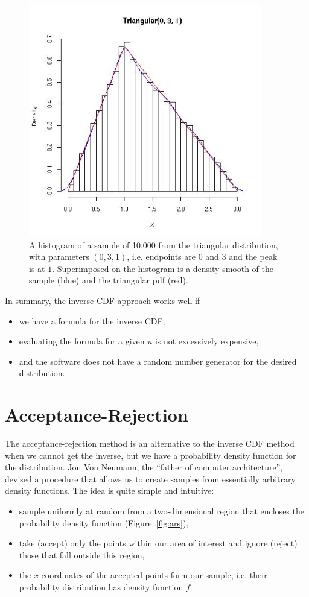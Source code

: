 \begin{figure}[htbp]
  \begin{center}
    \leavevmode
    \includegraphics[width=4in]{RNG/images/TriaInvCDF.jpg}
    \caption{A histogram of a sample of 10,000 from the triangular distribution, with
    parameters $(0, 3, 1)$, i.e. endpoints are $0$ and $3$ and the peak is at $1$.
    Superimposed on the histogram is a density smooth of the sample (blue) and 
    the triangular pdf (red).}
    \label{fig:invTria}
  \end{center}
\end{figure}

In summary,
the inverse CDF approach works well if 
\begin{itemize}
\item we have a formula for the inverse CDF,
\item evaluating the formula for a given $u$ is not
excessively expensive,
\item and the software does not have a random number generator for
the desired distribution.
\end{itemize}


\section{Acceptance-Rejection}\label{sec:ars}
The acceptance-rejection method is an alternative to the inverse CDF method
when we cannot get the inverse, but we have a probability density function 
for the distribution.  Jon Von Neumann, the
``father of computer architecture'', devised a procedure that allows
us to create samples from essentially arbitrary density functions.  
The idea is quite simple and intuitive: 
\begin{itemize}
\item sample uniformly at random from a two-dimensional region 
 that encloses the probability density function (Figure~\ref{fig:ars}),
\item take (accept) only the points within our area of interest and ignore (reject)
those that fall outside this region, 
\item the $x$-coordinates of the accepted points form our 
sample, i.e. their probability distribution has density 
function $f$.
\end{itemize}

